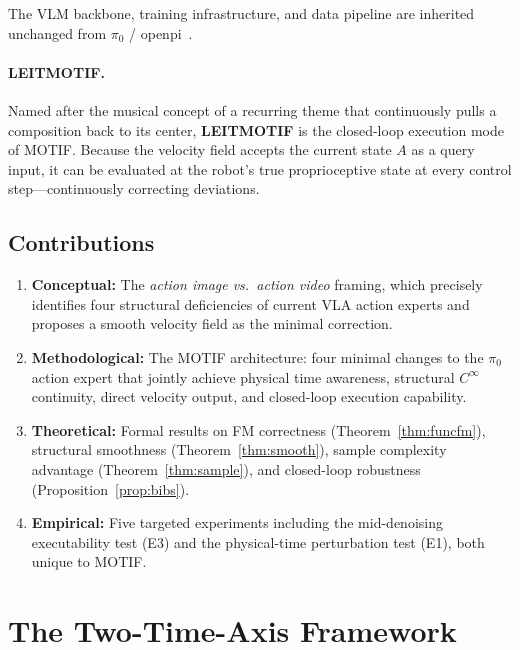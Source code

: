 \documentclass[11pt]{article}
\theoremstyle{plain}
\theoremstyle{definition}
\begin{document}
The VLM backbone, training infrastructure, and data pipeline
are inherited unchanged from $\pi_0$ / openpi~\cite{openpi2025}.

\paragraph{LEITMOTIF.}
Named after the musical concept of a recurring theme that continuously
pulls a composition back to its center, \textbf{LEITMOTIF} is the
closed-loop execution mode of MOTIF.
Because the velocity field accepts the current state $A$ as a query
input, it can be evaluated at the robot's true proprioceptive state
at every control step---continuously correcting deviations.

\subsection{Contributions}

\begin{enumerate}[leftmargin=2em]
  \item \textbf{Conceptual:} The \emph{action image vs.\ action video}
    framing, which precisely identifies four structural deficiencies of
    current VLA action experts and proposes a smooth velocity field as
    the minimal correction.
  \item \textbf{Methodological:} The MOTIF architecture: four minimal
    changes to the $\pi_0$ action expert that jointly achieve
    physical time awareness, structural $C^\infty$ continuity,
    direct velocity output, and closed-loop execution capability.
  \item \textbf{Theoretical:} Formal results on FM correctness
    (Theorem~\ref{thm:funcfm}), structural smoothness
    (Theorem~\ref{thm:smooth}), sample complexity advantage
    (Theorem~\ref{thm:sample}), and closed-loop robustness
    (Proposition~\ref{prop:bibs}).
  \item \textbf{Empirical:} Five targeted experiments including the
    mid-denoising executability test (E3) and the physical-time
    perturbation test (E1), both unique to MOTIF.
\end{enumerate}

\section{The Two-Time-Axis Framework}
\label{sec:framework}
\end{document}
